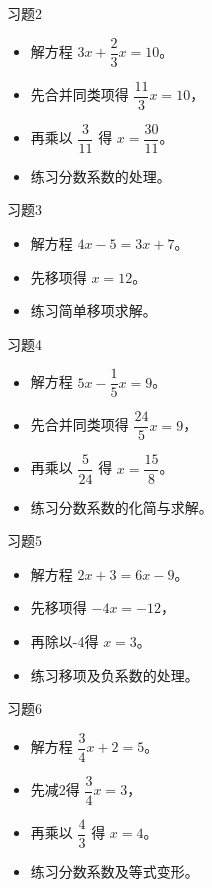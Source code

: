 \documentclass{ctexbeamer}
\begin{document}
\begin{frame}{习题2}
  \begin{itemize}
    \item 解方程 \(3x + \dfrac{2}{3}x = 10\)。
    \item 先合并同类项得 \(\dfrac{11}{3}x = 10\)，
    \item 再乘以 \(\dfrac{3}{11}\) 得 \(x = \dfrac{30}{11}\)。
    \item 练习分数系数的处理。
  \end{itemize}
\end{frame}

\begin{frame}{习题3}
  \begin{itemize}
    \item 解方程 \(4x - 5 = 3x + 7\)。
    \item 先移项得 \(x = 12\)。
    \item 练习简单移项求解。
  \end{itemize}
\end{frame}

\begin{frame}{习题4}
  \begin{itemize}
    \item 解方程 \(5x - \dfrac{1}{5}x = 9\)。
    \item 先合并同类项得 \(\dfrac{24}{5}x = 9\)，
    \item 再乘以 \(\dfrac{5}{24}\) 得 \(x = \dfrac{15}{8}\)。
    \item 练习分数系数的化简与求解。
  \end{itemize}
\end{frame}

\begin{frame}{习题5}
  \begin{itemize}
    \item 解方程 \(2x + 3 = 6x - 9\)。
    \item 先移项得 \(-4x = -12\)，
    \item 再除以-4得 \(x = 3\)。
    \item 练习移项及负系数的处理。
  \end{itemize}
\end{frame}

\begin{frame}{习题6}
  \begin{itemize}
    \item 解方程 \(\dfrac{3}{4}x + 2 = 5\)。
    \item 先减2得 \(\dfrac{3}{4}x = 3\)，
    \item 再乘以 \(\dfrac{4}{3}\) 得 \(x = 4\)。
    \item 练习分数系数及等式变形。
  \end{itemize}
\end{frame}
\end{document}
